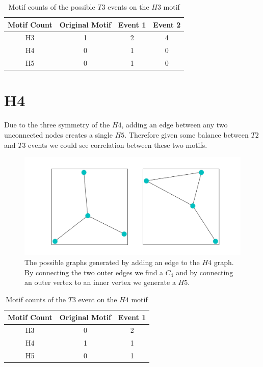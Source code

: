 \begin{table}
    \centering
    \begin{tabular}{||c c c c||} 
    \hline
    Motif Count & Original Motif & Event 1 & Event 2\\ [0.5ex] 
    \hline\hline
    H3 & 1 & 2 & 4\\ 
    \hline
    H4 & 0& 1 & 0  \\
    \hline
    H5 & 0& 1 & 0  \\
    \hline
   \end{tabular}
   \caption{Motif counts of the possible $T3$ events on the $H3$ motif}
   \label{table:12}
\end{table}

\section{H4}
Due to the three symmetry of the $H4$, adding an edge between any two unconnected nodes creates a single $H5$. Therefore given some balance between $T2$ and $T3$ events
we could see correlation between these two motifs.

\begin{figure}[!ht]
    \includegraphics[width=14cm]{Images/H4_T3_evolution.png}
    \centering
    \caption{The possible graphs generated by adding an edge to the $H4$ graph. By connecting the 
    two outer edges we find a $C_4$ and by connecting an outer vertex to an inner vertex we generate a $H5$.}
\end{figure}

\begin{table}
    \centering
    \begin{tabular}{||c c c||} 
    \hline
    Motif Count & Original Motif & Event 1 \\ [0.5ex] 
    \hline
    H3 & 0 & 2 \\ 
    \hline
    H4 & 1 & 1 \\
    \hline
    H5 & 0 & 1 \\
    \hline
   \end{tabular}
   \caption{Motif counts of the $T3$ event on the $H4$ motif}
   \label{table:13}
\end{table}

